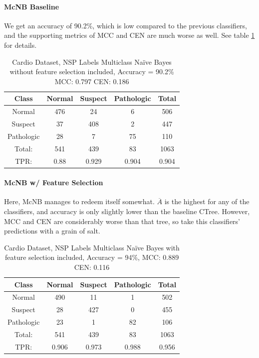 \paragraph{McNB Baseline}
We get an accuracy of 90.2\%, which is low compared to the previous classifiers, and the supporting metrics of MCC and CEN are much worse as well.  See table \ref{tab:cardioNSPmcnbbase} for details.
\begin{table}[h]
	\centering
	\begin{tabular}{|c|c|c|c|c|}
		\hline
Class&Normal&Suspect&Pathologic&Total\\\hline
Normal&476&24&6&506\\
Suspect&37&408&2&447\\
Pathologic&28&7&75&110\\\hline
Total:&541&439&83&1063\\
TPR:&0.88&0.929&0.904&0.904\\
\hline
	\end{tabular}
	\caption[Cardiotocography NSP: Multiclass Na\"ive Bayes without Feature Selection Confusion Matrix]{Cardio Dataset, NSP Labels Multiclass Na\"ive Bayes without feature selection included, Accuracy = 90.2\% MCC: 0.797 CEN: 0.186}
\label{tab:cardioNSPmcnbbase}
\end{table}
\paragraph{McNB w/ Feature Selection}
Here, McNB manages to redeem itself somewhat.  $\overline{A}$ is the highest for any of the classifiers, and accuracy is only slightly lower than the baseline CTree.  However, MCC and CEN are considerably worse than that tree, so take this classifiers' predictions with a grain of salt.  
\begin{table}[h]
	\centering
	\begin{tabular}{|c|c|c|c|c|}
		\hline
Class&Normal&Suspect&Pathologic&Total\\\hline
Normal&490&11&1&502\\
Suspect&28&427&0&455\\
Pathologic&23&1&82&106\\\hline
Total:&541&439&83&1063\\
TPR:&0.906&0.973&0.988&0.956\\
\hline
	\end{tabular}
	\caption[Cardiotocography NSP: Multiclass Na\"ive Bayes with Feature Selection Confusion Matrix]{Cardio Dataset, NSP Labels Multiclass Na\"ive Bayes with feature selection included, Accuracy = 94\%, MCC: 0.889 CEN: 0.116}
	\label{tab:cardioNSPmcnb}
\end{table}

